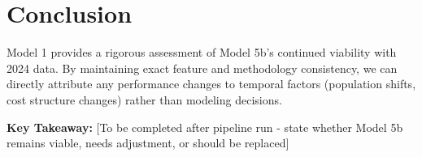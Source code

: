 \section{Conclusion}

Model 1 provides a rigorous assessment of Model 5b's continued viability with 2024 data. By maintaining exact feature and methodology consistency, we can directly attribute any performance changes to temporal factors (population shifts, cost structure changes) rather than modeling decisions.

\textbf{Key Takeaway:} [To be completed after pipeline run - state whether Model 5b remains viable, needs adjustment, or should be replaced]